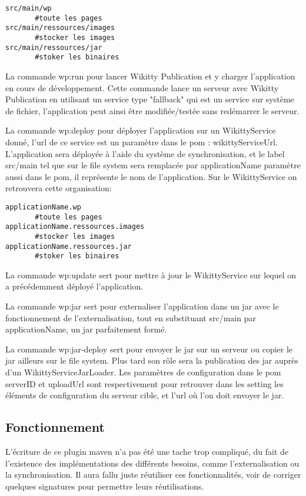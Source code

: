 \begin{verbatim}
src/main/wp
       #toute les pages
src/main/ressources/images
       #stocker les images
src/main/ressources/jar
       #stoker les binaires
\end{verbatim}

La commande wp:run pour lancer Wikitty Publication et y charger l'application
en cours de développement. Cette commande lance un serveur avec Wikitty Publication
en utilisant un service type "fallback" qui est un service sur système de fichier,
l'application peut ainsi être modifiée/testée sans redémarrer le serveur. 

La commande wp:deploy pour déployer l'application sur un WikittyService donné,
l'url de ce service est un paramètre dans le pom : wikittyServiceUrl. 
L'application sera déployée à l'aide du système de synchronisation, et le label
src/main tel que sur le file system sera remplacée par applicationName paramètre
aussi dans le pom, il représente le nom de l'application. Sur le WikittyService
on retrouvera cette organisation:
\begin{verbatim}
applicationName.wp
       #toute les pages
applicationName.ressources.images
       #stocker les images
applicationName.ressources.jar
       #stoker les binaires
\end{verbatim}


La commande wp:update sert pour mettre à jour le WikittyService sur lequel
on a précédemment déployé l'application.

La commande wp:jar sert pour externaliser l'application dans un jar avec le
fonctionnement de l'externalisation, tout en substituant src/main par applicationName,
un jar parfaitement formé.

La commande wp:jar-deploy sert pour envoyer le jar sur un serveur ou copier
le jar ailleurs sur le file system. Plus tard son rôle sera la publication 
des jar auprès d'un WikittyServiceJarLoader. Les paramètres de configuration dans
le pom serverID et uploadUrl sont respectivement pour retrouver dans les 
setting les éléments de configuration du serveur cible, et l'url où l'on 
doit envoyer le jar.


\subsection{Fonctionnement}

L'écriture de ce plugin maven n'a pas été une tache trop compliqué, du fait de 
l'existence des implémentations des différents besoins, comme l'externalisation
ou la synchronisation. Il aura fallu juste réutiliser ces fonctionnalités, voir
de corriger quelques signatures pour permettre leurs réutilisations.

